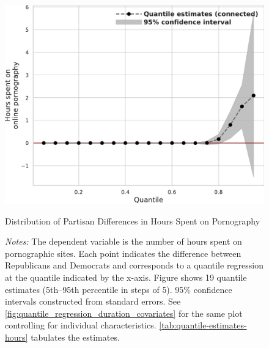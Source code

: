\documentclass[12pt,twoside]{article}
\begin{document}
\begin{figure}[t]
	\centering
	\includegraphics[width=.7\linewidth]{figs/quantile_reg_duration_adult.pdf}
	\caption{Distribution of Partisan Differences in Hours Spent on Pornography}
	\caption*{\footnotesize \emph{Notes:} 
		The dependent variable is the number of hours spent on pornographic sites.
		Each point indicates the difference between Republicans and Democrats and corresponds to a quantile regression at the quantile indicated by the x-axis.
            Figure shows 19 quantile estimates (5th--95th percentile in steps of 5).
		95\% confidence intervals constructed from standard errors.
		See \cref{fig:quantile_regression_duration_covariates} for the same plot controlling for individual characteristics.
        \cref{tab:quantile-estimates-hours} tabulates the estimates.
	}
	\label{fig:quantile_regression_duration}
\end{figure}
\end{document}
